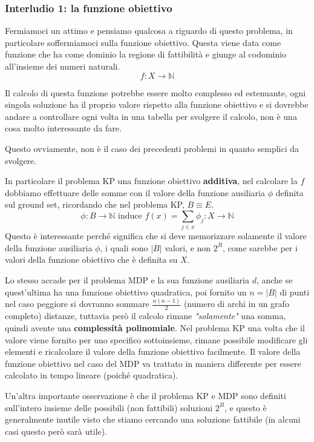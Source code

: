 \documentclass{article}
\begin{document}
\subsubsection{Interludio 1: la funzione obiettivo}
Fermiamoci un attimo e pensiamo qualcosa a riguardo di questo problema, in particolare soffermiamoci sulla funzione obiettivo.
Questa viene data come funzione che ha come dominio la regione di fattibilità e giunge al
codominio all'insieme dei numeri naturali.
$$f:X\rightarrow \mathbb{N}$$

Il calcolo di questa funzione potrebbe essere molto complesso ed estenuante, ogni singola soluzione ha il proprio valore rispetto alla funzione obiettivo
e si dovrebbe andare a controllare ogni volta in una tabella per svolgere il calcolo, non è una cosa molto interessante da fare.

Questo ovviamente, non è il caso dei precedenti problemi in quanto semplici da svolgere.

In particolare il problema KP una funzione obiettivo \textbf{additiva}, nel calcolare la $f$ dobbiamo effettuare delle somme
con il valore della funzione ausiliaria $\phi$ definita sul ground set, ricordando che nel problema KP, $B \equiv E$.
$$\phi : B\rightarrow \mathbb{N} \text{ induce } f(x)=\sum_{j\in x}\phi_j : X \rightarrow \mathbb{N}$$
Questo è interessante perché significa che si deve memorizzare solamente il valore della funzione ausiliaria $\phi$,
i quali sono $|B|$ valori, e non $2^B$, come sarebbe per i valori della funzione obiettivo che è definita su $X$.

Lo stesso accade per il problema MDP e la sua funzione ausiliaria $d$, anche se quest'ultima ha una funzione obiettivo quadratica,
poi fornito un $n=|B|$ di punti nel caso peggiore si dovranno sommare $\frac{n(n-1)}{2}$ (numero di archi in un grafo completo) distanze, tuttavia però il
calcolo rimane \textit{"solamente"} una somma, quindi avente una \textbf{complessità polinomiale}.
\newline
Nel problema KP una volta che il valore viene fornito per uno specifico sottoinsieme, rimane possibile modificare gli elementi
e ricalcolare il valore della funzione obiettivo facilmente. Il valore della funzione obiettivo nel caso del MDP va trattato in maniera differente
per essere calcolato in tempo lineare (poiché quadratica).

Un'altra importante osservazione è che il problema KP e MDP sono definiti sull'intero insieme delle possibili (non fattibili)
soluzioni $2^B$, e questo è generalmente inutile visto che stiamo cercando
una soluzione fattibile (in alcuni casi questo però sarà utile).
\end{document}
